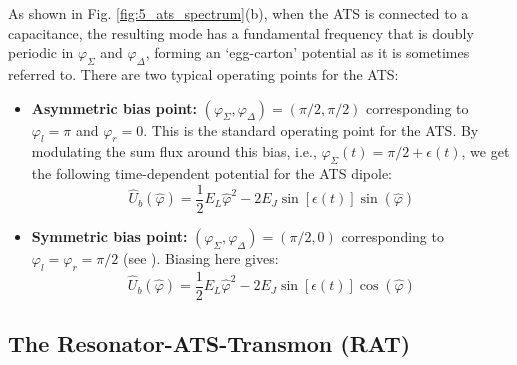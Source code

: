 As shown in Fig. \ref{fig:5_ats_spectrum}(b), when the ATS is connected to a capacitance, the resulting mode has a fundamental frequency that is doubly periodic in $\varphi_\Sigma$ and $\varphi_\Delta$, forming an `egg-carton' potential as it is sometimes referred to. There are two typical operating points for the ATS:

\begin{itemize}
    \item \textbf{Asymmetric bias point:} $(\varphi_\Sigma, \varphi_\Delta) = (\pi/2, \pi/2)$ corresponding to $\varphi_l = \pi$ and $\varphi_r = 0$. This is the standard operating point for the ATS. By modulating the sum flux around this bias, i.e., $\varphi_\Sigma(t) = \pi/2 + \epsilon(t)$, we get the following time-dependent potential for the ATS dipole:
    \begin{equation}
        \hat{U}_b(\hat{\varphi}) = \frac{1}{2}E_L \hat{\varphi}^2 - 2E_J \sin[\epsilon(t)]\sin(\hat{\varphi})
    \end{equation}
\item \textbf{Symmetric bias point:} $(\varphi_\Sigma, \varphi_\Delta) = (\pi/2, 0)$ corresponding to $\varphi_l = \varphi_r = \pi/2$ (see \cite{maiti2024ancilla}). Biasing here gives:
\begin{equation}
        \hat{U}_b(\hat{\varphi}) = \frac{1}{2}E_L \hat{\varphi}^2 - 2E_J \sin[\epsilon(t)]\cos(\hat{\varphi})
    \end{equation}
\end{itemize}
\subsection{The Resonator-ATS-Transmon (RAT)}

